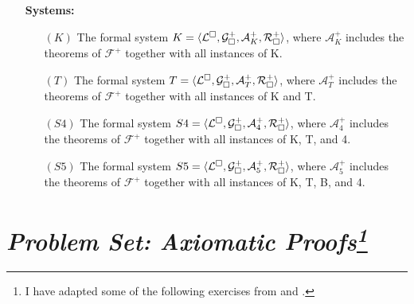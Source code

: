 \documentclass[a4paper, 11pt]{article} %
\begin{document}
	
\begin{enumerate}[leftmargin=1.2in,labelsep=.15in] %
\item[\bf Systems:]
	\begin{enumerate}
	\item[$(K)$] The formal system $K=\langle\mathcal{L}^{\square},\mathcal{G}_\square^+,\mathcal{A}_K^+,\mathcal{R}_\square^+\rangle$, where $\mathcal{A}_K^+$ includes the theorems of $\mathcal{F}^+$ together with all instances of K.
	\item[$(T)$] The formal system $T=\langle\mathcal{L}^{\square},\mathcal{G}_\square^+,\mathcal{A}_T^+,\mathcal{R}_\square^+\rangle$, where $\mathcal{A}_T^+$ includes the theorems of $\mathcal{F}^+$ together with all instances of K and T.
	\item[$(S4)$] The formal system $S4=\langle\mathcal{L}^{\square},\mathcal{G}_\square^+,\mathcal{A}_4^+,\mathcal{R}_\square^+\rangle$, where $\mathcal{A}_{4}^+$ includes the theorems of $\mathcal{F}^+$ together with all instances of K, T, and 4.
	\item[$(S5)$] The formal system $S5=\langle\mathcal{L}^{\square},\mathcal{G}_\square^+,\mathcal{A}_5^+,\mathcal{R}_\square^+\rangle$, where $\mathcal{A}_{5}^+$ includes the theorems of $\mathcal{F}^+$ together with all instances of K, T, B, and 4.
	\end{enumerate}
\end{enumerate}




\section*{\it Problem Set: Axiomatic Proofs\footnote{I have adapted some of the following exercises from \citet{Studd2016} and \citet{Sider2010}.}}
\end{document}
